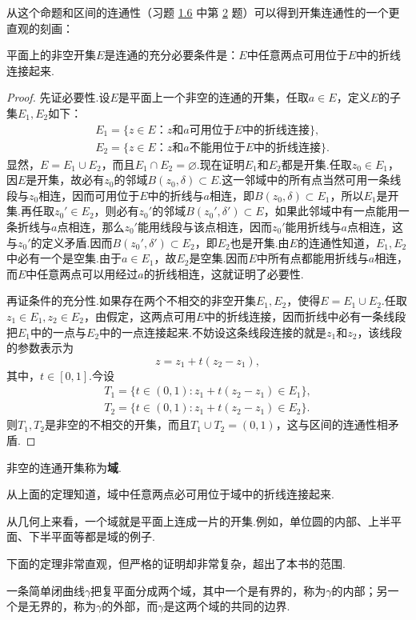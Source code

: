 从这个命题和区间的连通性（习题 \hyperlink{xiti1.6}{1.6} 中第 \hyperlink{xiti1.6.2}{2} 题）可以得到开集连通性的一个更直观的刻画：
\begin{theorem}
平面上的非空开集$E$是连通的充分必要条件是：$E$中任意两点可用位于$E$中的折线连接起来.
\end{theorem}
\begin{proof}
先证必要性.设$E$是平面上一个非空的连通的开集，任取$a\in E$，定义$E$的子集$E_1,E_2$如下：
\begin{align*}
&E_1=\mbox{$\{z\in E$：$z$和$a$可用位于$E$中的折线连接$\}$},\\
&E_2=\mbox{$\{z\in E$：$z$和$a$不能用位于$E$中的折线连接$\}$}.
\end{align*}
显然，$E=E_1\cup E_2$，而且$E_1\cap E_2=\varnothing$.现在证明$E_1$和$E_2$都是开集.任取$z_0\in E_1$，因$E$是开集，故必有$z_0$的邻域$B(z_0,\delta)\subset E$.这一邻域中的所有点当然可用一条线段与$z_0$相连，因而可用位于$E$中的折线与$a$相连，即$B(z_0,\delta)\subset E_1$，所以$E_1$是开集.再任取$z_0'\in E_2 $，则必有$z_0'$的邻域$B(z_0',\delta')\subset E$，如果此邻域中有一点能用一条折线与$a$点相连，那么$z_0'$能用线段与该点相连，因而$z_0'$能用折线与$a$点相连，这与$z_0'$的定义矛盾.因而$B(z_0',\delta')\subset E_2$，即$E_2$也是开集.由$E$的连通性知道，$E_1,E_2$中必有一个是空集.由于$a\in E_1$，故$E_2$是空集.因而$E$中所有点都能用折线与$a$相连，而$E$中任意两点可以用经过$a$的折线相连，这就证明了必要性.

再证条件的充分性.如果存在两个不相交的非空开集$E_1,E_2$，使得$E=E_1\cup E_2$.任取$z_1\in E_1,z_2\in E_2$，由假定，这两点可用$E$中的折线连接，因而折线中必有一条线段把$E_1$中的一点与$E_2$中的一点连接起来.不妨设这条线段连接的就是$z_1$和$z_2$，该线段的参数表示为
\[z=z_1+t(z_2-z_1),\]
其中，$t\in[0,1]$.今设
\begin{gather*}
T_1=\{t\in(0,1):z_1+t(z_2-z_1)\in E_1\},\\
T_2=\{t\in(0,1):z_1+t(z_2-z_1)\in E_2\}.
\end{gather*}
则$T_1,T_2$是非空的不相交的开集，而且$T_1\cup T_2=(0,1)$，这与区间的连通性相矛盾.
\end{proof}
\begin{definition}
非空的连通开集称为\textbf{域}.
\end{definition}

从上面的定理知道，域中任意两点必可用位于域中的折线连接起来.

从几何上来看，一个域就是平面上连成一片的开集.例如，单位圆的内部、上半平面、下半平面等都是域的例子.

下面的定理非常直观，但严格的证明却非常复杂，超出了本书的范围.
\begin{theorem}
一条简单闭曲线$\gamma$把复平面分成两个域，其中一个是有界的，称为$\gamma$的内部；另一个是无界的，称为$\gamma$的外部，而$\gamma$是这两个域的共同的边界.
\end{theorem}

